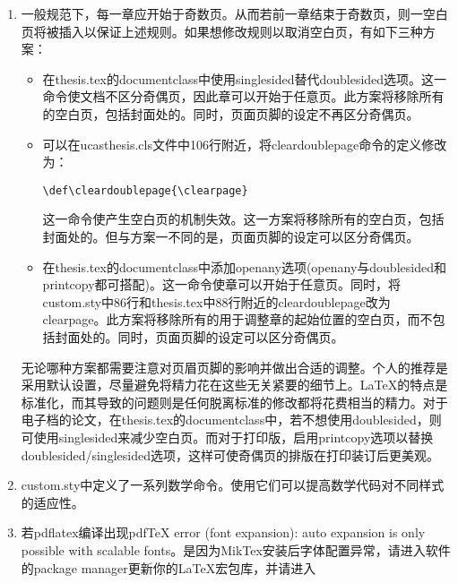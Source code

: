 \begin{enumerate}
     关于页眉页脚各个命令的作用和意义请参见fancyhdr的用户文档\url{https://www.ctan.org/pkg/fancyhdr?lang=en}。如果需要在页眉页脚中添加章节字样，请使用
      \begin{enumerate}
          \item \verb+\CTEXthechapter+  显示: 第X章
          \item \verb+\CTEXthesection+  显示: 第X节
      \end{enumerate}
      参见ctex宏包用户文档\url{http://ctan.mirror.rafal.ca/language/chinese/ctex/ctex.pdf}
  \item 一般规范下，每一章应开始于奇数页。从而若前一章结束于奇数页，则一空白页将被插入以保证上述规则。如果想修改规则以取消空白页，有如下三种方案：
\begin{itemize}
    \item 在thesis.tex的documentclass中使用singlesided替代doublesided选项。这一命令使文档不区分奇偶页，因此章可以开始于任意页。此方案将移除所有的空白页，包括封面处的。同时，页面页脚的设定不再区分奇偶页。
    \item 可以在ucasthesis.cls文件中106行附近，将cleardoublepage命令的定义修改为：

      \verb|\def\cleardoublepage{\clearpage}|

      这一命令使产生空白页的机制失效。这一方案将移除所有的空白页，包括封面处的。但与方案一不同的是，页面页脚的设定可以区分奇偶页。
  \item 在thesis.tex的documentclass中添加openany选项(openany与doublesided和printcopy都可搭配)。这一命令使章可以开始于任意页。同时，将custom.sty中86行和thesis.tex中88行附近的cleardoublepage改为clearpage。此方案将移除所有的用于调整章的起始位置的空白页，而不包括封面处的。同时，页面页脚的设定可以区分奇偶页。
\end{itemize}
      无论哪种方案都需要注意对页眉页脚的影响并做出合适的调整。个人的推荐是采用默认设置，尽量避免将精力花在这些无关紧要的细节上。\LaTeX{}的特点是标准化，而其导致的问题则是任何脱离标准的修改都将花费相当的精力。对于电子档的论文，在thesis.tex的documentclass中，若不想使用doublesided，则可使用singlesided来减少空白页。而对于打印版，启用printcopy选项以替换doublesided/singlesided选项，这样可使奇偶页的排版在打印装订后更美观。
  \item custom.sty中定义了一系列数学命令。使用它们可以提高数学代码对不同样式的适应性。
  \item 若pdflatex编译出现pdfTeX error (font expansion): auto expansion is only possible with scalable fonts。是因为MikTex安装后字体配置异常，请进入软件的package manager更新你的\LaTeX{}宏包库，并请进入
      

\end{enumerate}
